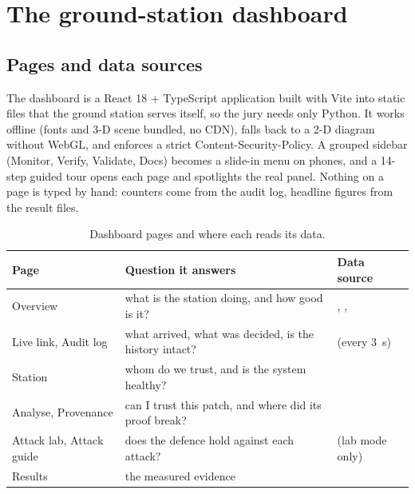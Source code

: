 \section{The ground-station dashboard}\label{sec:dash}

\subsection{Pages and data sources}
The dashboard is a React 18 + TypeScript application built with Vite into static files that the ground station serves itself, so the jury needs only Python. It works offline (fonts and 3-D scene bundled, no CDN), falls back to a 2-D diagram without WebGL, and enforces a strict Content-Security-Policy. A grouped sidebar (Monitor, Verify, Validate, Docs) becomes a slide-in menu on phones, and a 14-step guided tour opens each page and spotlights the real panel. Nothing on a page is typed by hand: counters come from the audit log, headline figures from the result files.

\begin{table}[!htbp]
\centering\small
\begin{tabularx}{\textwidth}{|L{3.3cm}|Y|L{4.6cm}|}
\hline
\textbf{Page} & \textbf{Question it answers} & \textbf{Data source}\\
\hline
Overview & what is the station doing, and how good is it? & , , \\
\hline
Live link, Audit log & what arrived, what was decided, is the history intact? &  (every 3~s)\\
\hline
Station & whom do we trust, and is the system healthy? & \\
\hline
Analyse, Provenance & can I trust this patch, and where did its proof break? & \\
\hline
Attack lab, Attack guide & does the defence hold against each attack? &  (lab mode only)\\
\hline
Results & the measured evidence & \\
\hline
\end{tabularx}
\caption{Dashboard pages and where each reads its data.}
\end{table}


